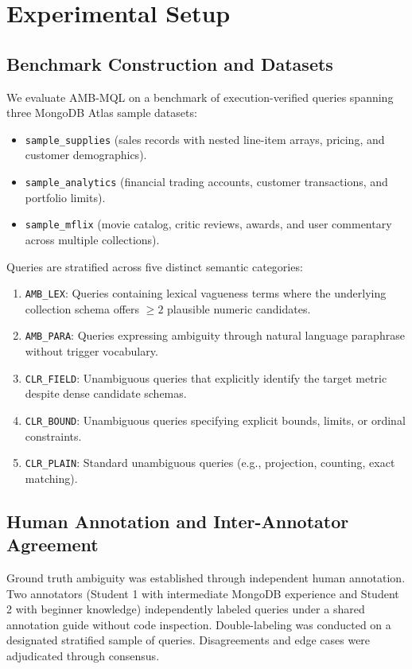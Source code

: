 \section{Experimental Setup}
\label{sec:setup}

\subsection{Benchmark Construction and Datasets}
We evaluate AMB-MQL on a benchmark of \numTotalQueries{} execution-verified queries spanning three MongoDB Atlas sample datasets:
\begin{itemize}
    \item \texttt{sample\_supplies} (sales records with nested line-item arrays, pricing, and customer demographics).
    \item \texttt{sample\_analytics} (financial trading accounts, customer transactions, and portfolio limits).
    \item \texttt{sample\_mflix} (movie catalog, critic reviews, awards, and user commentary across multiple collections).
\end{itemize}
Queries are stratified across five distinct semantic categories:
\begin{enumerate}
    \item \texttt{AMB\_LEX}: Queries containing lexical vagueness terms where the underlying collection schema offers $\ge 2$ plausible numeric candidates.
    \item \texttt{AMB\_PARA}: Queries expressing ambiguity through natural language paraphrase without trigger vocabulary.
    \item \texttt{CLR\_FIELD}: Unambiguous queries that explicitly identify the target metric despite dense candidate schemas.
    \item \texttt{CLR\_BOUND}: Unambiguous queries specifying explicit bounds, limits, or ordinal constraints.
    \item \texttt{CLR\_PLAIN}: Standard unambiguous queries (e.g., projection, counting, exact matching).
\end{enumerate}

\subsection{Human Annotation and Inter-Annotator Agreement}
Ground truth ambiguity was established through independent human annotation. Two annotators (Student 1 with intermediate MongoDB experience and Student 2 with beginner knowledge) independently labeled queries under a shared annotation guide without code inspection. Double-labeling was conducted on a designated stratified sample of \numDoubleLabelStratified{} queries. Disagreements and edge cases were adjudicated through consensus.

